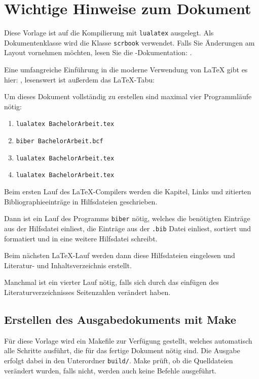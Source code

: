 \chapter{Wichtige Hinweise zum Dokument}\label{make}

Diese Vorlage ist auf die Kompilierung mit \texttt{lualatex} ausgelegt. 
Als Dokumentenklasse  wird die \KOMAScript\-Klasse \texttt{scrbook} verwendet.
Falls Sie Änderungen am Layout vornehmen möchten, lesen Sie die \KOMAScript-Dokumentation: \cite{koma}.

Eine umfangreiche Einführung in die moderne Verwendung von \LaTeX{} gibt es hier: \cite{toolbox}, lesenswert ist außerdem das \LaTeX-Tabu: \cite{l2tabu}

Um dieses Dokument vollständig zu erstellen sind maximal vier Programmläufe nötig:
\begin{enumerate}[nosep]
    \item \texttt{lualatex BachelorArbeit.tex}
    \item \texttt{biber BachelorArbeit.bcf}
    \item \texttt{lualatex BachelorArbeit.tex}
    \item \texttt{lualatex BachelorArbeit.tex}
\end{enumerate}

Beim ersten Lauf des \LaTeX-Compilers werden die Kapitel, Links und zitierten Bibliographieeinträge in Hilfsdateien geschrieben.

Dann ist ein Lauf des Programms \texttt{biber} nötig, welches die benötigten Einträge aus der Hilfsdatei einliest, die Einträge aus der \texttt{.bib} Datei einliest, sortiert und formatiert und in eine weitere Hilfsdatei schreibt.

Beim nächsten \LaTeX-Lauf werden dann diese Hilfsdateien eingelesen und Literatur- und Inhaltsverzeichnis erstellt.

Manchmal ist ein vierter Lauf nötig, falls sich durch das einfügen des Literaturverzeichnisses Seitenzahlen verändert haben.


\section{Erstellen des Ausgabedokuments mit Make}

Für diese Vorlage wird ein Makefile zur Verfügung gestellt, welches automatisch alle Schritte ausführt, die für das fertige Dokument nötig sind.
Die Ausgabe erfolgt dabei in den Unterordner \texttt{build/}.
Make prüft, ob die Quelldateien verändert wurden, falls nicht, werden auch keine Befehle ausgeführt.

